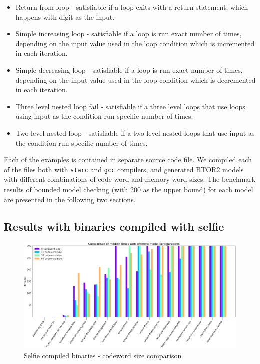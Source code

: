 \documentclass[12pt]{article}
\begin{document}
\begin{itemize}
    \item Return from loop - satisfiable if a loop exits with a return
        statement, which happens with digit as the input.
    \item Simple increasing loop - satisfiable if a loop is run exact number of
        times, depending on the input value used in the loop condition which is
        incremented in each iteration.
    \item Simple decreasing loop - satisfiable if a loop is run exact number of
        times, depending on the input value used in the loop condition which is
        decremented in each iteration. 
    \item Three level nested loop fail - satisfiable if a three level loops
        that use loops using input as the condition run specific number of
        times.
    \item Two level nested loop - satisfiable if a two level nested loops that
        use input as the condition run specific number of times.

\end{itemize}

Each of the examples is contained in separate source code file. We compiled
each of the files both with \texttt{starc} and \texttt{gcc} compilers, and
generated BTOR2 models with different combinations of code-word and memory-word
sizes. The benchmark results of bounded model checking (with 200 as the upper
bound) for each model are presented in the following two sections.

\subsection{Results with binaries compiled with selfie}

\begin{figure}[!h]
    \includegraphics[width=\linewidth]{assets/benches/codeword_selfie_linear.png}
    \centering
    \caption{
        Selfie compiled binaries - codeword size comparison
    }
    \label{fig:codeword_selfie_linear}
\end{figure}
\end{document}

